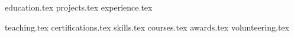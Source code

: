 \documentclass[letterpaper,11pt]{article}
\begin{document}


{education.tex}
{projects.tex}
{experience.tex}

\pagebreak

{teaching.tex}
\sidebyside
    {{certifications.tex}}
    {{skills.tex}
    {courses.tex}}
{awards.tex}
{volunteering.tex}
\end{document}
